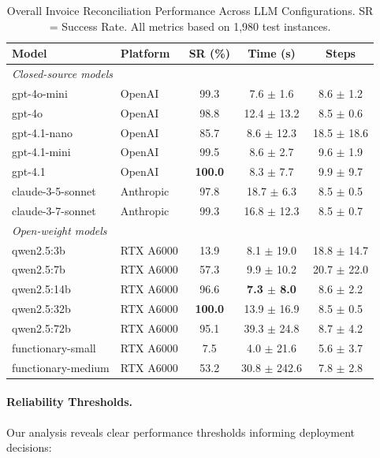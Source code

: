 \begin{table}[htbp]
\centering
\caption{Overall Invoice Reconciliation Performance Across LLM Configurations. SR = Success Rate. All metrics based on 1,980 test instances.}
\label{tab:asr_overall_performance}
\begin{tabular}{@{}llccc@{}}
\toprule
\textbf{Model} & \textbf{Platform} & \textbf{SR (\%)} & \textbf{Time (s)} & \textbf{Steps} \\
\midrule
\multicolumn{5}{l}{\textit{Closed-source models}} \\
gpt-4o-mini & OpenAI & 99.3 & 7.6 $\pm$ 1.6 & 8.6 $\pm$ 1.2 \\
gpt-4o & OpenAI & 98.8 & 12.4 $\pm$ 13.2 & 8.5 $\pm$ 0.6 \\
gpt-4.1-nano & OpenAI & 85.7 & 8.6 $\pm$ 12.3 & 18.5 $\pm$ 18.6 \\
gpt-4.1-mini & OpenAI & 99.5 & 8.6 $\pm$ 2.7 & 9.6 $\pm$ 1.9 \\
gpt-4.1 & OpenAI & \textbf{100.0} & 8.3 $\pm$ 7.7 & 9.9 $\pm$ 9.7 \\
claude-3-5-sonnet & Anthropic & 97.8 & 18.7 $\pm$ 6.3 & 8.5 $\pm$ 0.5 \\
claude-3-7-sonnet & Anthropic & 99.3 & 16.8 $\pm$ 12.3 & 8.5 $\pm$ 0.7 \\
\midrule
\multicolumn{5}{l}{\textit{Open-weight models}} \\
qwen2.5:3b & RTX A6000 & 13.9 & 8.1 $\pm$ 19.0 & 18.8 $\pm$ 14.7 \\
qwen2.5:7b & RTX A6000 & 57.3 & 9.9 $\pm$ 10.2 & 20.7 $\pm$ 22.0 \\
qwen2.5:14b & RTX A6000 & 96.6 & \textbf{7.3 $\pm$ 8.0} & 8.6 $\pm$ 2.2 \\
qwen2.5:32b & RTX A6000 & \textbf{100.0} & 13.9 $\pm$ 16.9 & 8.5 $\pm$ 0.5 \\
qwen2.5:72b & RTX A6000 & 95.1 & 39.3 $\pm$ 24.8 & 8.7 $\pm$ 4.2 \\
functionary-small & RTX A6000 & 7.5 & 4.0 $\pm$ 21.6 & 5.6 $\pm$ 3.7 \\
functionary-medium & RTX A6000 & 53.2 & 30.8 $\pm$ 242.6 & 7.8 $\pm$ 2.8 \\
\bottomrule
\end{tabular}
\end{table}

\paragraph{Reliability Thresholds.} Our analysis reveals clear performance thresholds informing deployment decisions:

